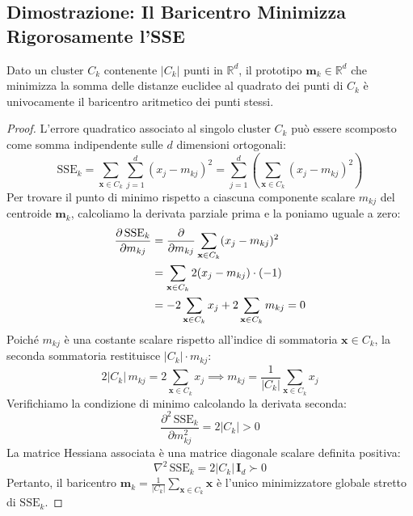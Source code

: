 \subsection{Dimostrazione: Il Baricentro Minimizza Rigorosamente l'SSE}

\begin{theorem}
Dato un cluster $C_k$ contenente $|C_k|$ punti in $\mathbb{R}^d$, il prototipo $\mathbf{m}_k \in \mathbb{R}^d$ che minimizza la somma delle distanze euclidee al quadrato dei punti di $C_k$ è univocamente il baricentro aritmetico dei punti stessi.
\end{theorem}

\begin{proof}
L'errore quadratico associato al singolo cluster $C_k$ può essere scomposto come somma indipendente sulle $d$ dimensioni ortogonali:
\begin{equation}
    \mathrm{SSE}_k = \sum_{\mathbf{x} \in C_k} \sum_{j=1}^d (x_j - m_{kj})^2 = \sum_{j=1}^d \left( \sum_{\mathbf{x} \in C_k} (x_j - m_{kj})^2 \right)
\end{equation}
Per trovare il punto di minimo rispetto a ciascuna componente scalare $m_{kj}$ del centroide $\mathbf{m}_k$, calcoliamo la derivata parziale prima e la poniamo uguale a zero:
\begin{align}
    \frac{\partial \, \mathrm{SSE}_k}{\partial m_{kj}} &= \frac{\partial}{\partial m_{kj}} \sum_{\mathbf{x} \in C_k} (x_j - m_{kj})^2 \notag \\
    &= \sum_{\mathbf{x} \in C_k} 2 (x_j - m_{kj}) \cdot (-1) \notag \\
    &= -2 \sum_{\mathbf{x} \in C_k} x_j + 2 \sum_{\mathbf{x} \in C_k} m_{kj} = 0
\end{align}
Poiché $m_{kj}$ è una costante scalare rispetto all'indice di sommatoria $\mathbf{x} \in C_k$, la seconda sommatoria restituisce $|C_k| \cdot m_{kj}$:
\begin{equation}
    2 |C_k| \, m_{kj} = 2 \sum_{\mathbf{x} \in C_k} x_j \implies m_{kj} = \frac{1}{|C_k|} \sum_{\mathbf{x} \in C_k} x_j
\end{equation}
Verifichiamo la condizione di minimo calcolando la derivata seconda:
\begin{equation}
    \frac{\partial^2 \, \mathrm{SSE}_k}{\partial m_{kj}^2} = 2 |C_k| > 0
\end{equation}
La matrice Hessiana associata è una matrice diagonale scalare definita positiva:
\begin{equation}
    \nabla^2 \, \mathrm{SSE}_k = 2 |C_k| \, \mathbf{I}_d \succ 0
\end{equation}
Pertanto, il baricentro $\mathbf{m}_k = \frac{1}{|C_k|} \sum_{\mathbf{x} \in C_k} \mathbf{x}$ è l'unico minimizzatore globale stretto di $\mathrm{SSE}_k$.
\end{proof}

